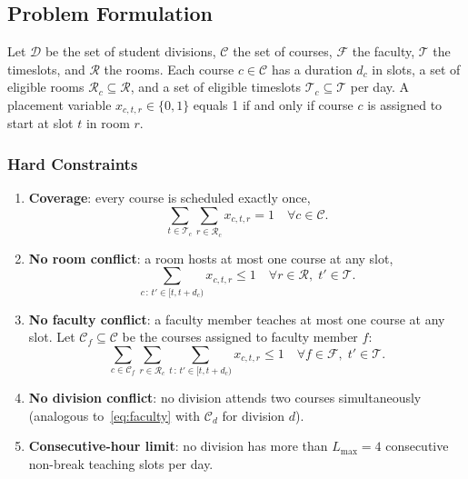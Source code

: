 \documentclass[conference]{IEEEtran}
\begin{document}
\subsection{Problem Formulation}\label{sec:formulation}

Let $\mathcal{D}$ be the set of student divisions, $\mathcal{C}$ the set of
courses, $\mathcal{F}$ the faculty, $\mathcal{T}$ the timeslots, and
$\mathcal{R}$ the rooms. Each course $c \in \mathcal{C}$ has a duration
$d_c$ in slots, a set of eligible rooms $\mathcal{R}_c \subseteq \mathcal{R}$,
and a set of eligible timeslots $\mathcal{T}_c \subseteq \mathcal{T}$ per day.
A placement variable $x_{c,t,r} \in \{0,1\}$ equals 1 if and only if course
$c$ is assigned to start at slot $t$ in room $r$.

\subsubsection{Hard Constraints}

\begin{enumerate}
  \item \textbf{Coverage}: every course is scheduled exactly once,
        \begin{equation}
          \sum_{t \in \mathcal{T}_c}\sum_{r \in \mathcal{R}_c} x_{c,t,r} = 1
          \quad \forall c \in \mathcal{C}.
          \label{eq:coverage}
        \end{equation}
  \item \textbf{No room conflict}: a room hosts at most one course at any slot,
        \begin{equation}
          \sum_{c \,:\, t' \in [t, t{+}d_c)} x_{c,t,r} \le 1
          \quad \forall r \in \mathcal{R},\; t' \in \mathcal{T}.
          \label{eq:room}
        \end{equation}
  \item \textbf{No faculty conflict}: a faculty member teaches at most one
        course at any slot. Let $\mathcal{C}_f \subseteq \mathcal{C}$ be the
        courses assigned to faculty member $f$:
        \begin{equation}
          \sum_{c \in \mathcal{C}_f}\sum_{r \in \mathcal{R}_c}
            \sum_{t \,:\, t' \in [t, t{+}d_c)} x_{c,t,r} \le 1
          \quad \forall f \in \mathcal{F},\; t' \in \mathcal{T}.
          \label{eq:faculty}
        \end{equation}
  \item \textbf{No division conflict}: no division attends two courses
        simultaneously (analogous to~\eqref{eq:faculty} with
        $\mathcal{C}_d$ for division $d$).
  \item \textbf{Consecutive-hour limit}: no division has more than
        $L_{\max}=4$ consecutive non-break teaching slots per day.
\end{enumerate}
\end{document}
